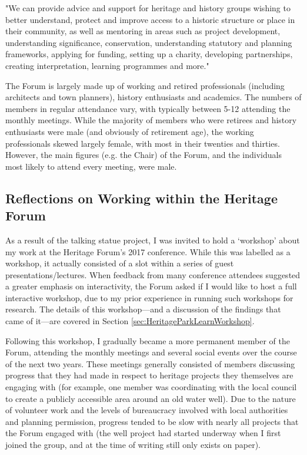 \begin{displayquote}
"We can provide advice and support for heritage and history groups wishing to better understand, protect and improve access to a historic structure or place in their community, as well as mentoring in areas such as project development, understanding significance, conservation, understanding statutory and planning frameworks, applying for funding, setting up a charity, developing partnerships, creating interpretation, learning programmes and more."
\end{displayquote}

The Forum is largely made up of working and retired professionals (including architects and town planners), history enthusiasts and academics. The numbers of members in regular attendance vary, with typically between 5-12 attending the monthly meetings. While the majority of members who were retirees and history enthusiasts were male (and obviously of retirement age), the working professionals skewed largely female, with most in their twenties and thirties. However, the main figures (e.g. the Chair) of the Forum, and the individuals most likely to attend every meeting, were male.

\subsection{Reflections on Working within the Heritage Forum}
As a result of the talking statue project, I was invited to hold a `workshop' about my work at the Heritage Forum's 2017 conference. While this was labelled as a workshop, it actually consisted of a slot within a series of guest presentations/lectures. When feedback from many conference attendees suggested a greater emphasis on interactivity, the Forum asked if I would like to host a full interactive workshop, due to my prior experience in running such workshops for research. The details of this workshop---and a discussion of the findings that came of it---are covered in Section \ref{sec:HeritageParkLearnWorkshop}.

Following this workshop, I gradually became a more permanent member of the Forum, attending the monthly meetings and several social events over the course of the next two years. These meetings generally consisted of members discussing progress that they had made in respect to heritage projects they themselves are engaging with (for example, one member was coordinating with the local council to create a publicly accessible area around an old water well). Due to the nature of volunteer work and the levels of bureaucracy involved with local authorities and planning permission, progress tended to be slow with nearly all projects that the Forum engaged with (the well project had started underway when I first joined the group, and at the time of writing still only exists on paper). 

